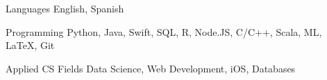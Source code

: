 

\begin{cvskills}

\cvskill
  {Languages} %
  {English, Spanish} %

  \cvskill
    {Programming} %
    {Python, Java, Swift, SQL, R, Node.JS, C/C++, Scala, ML, LaTeX, Git} %

  \cvskill
    {Applied CS Fields} %
    {Data Science, Web Development, iOS, Databases} %

\end{cvskills}
